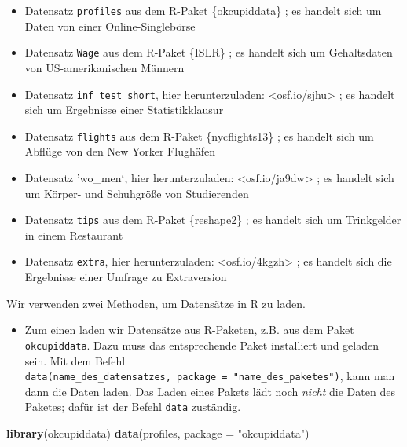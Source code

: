 \documentclass[12pt,ngerman,]{book}
\newenvironment{Shaded}{\begin{snugshade}}{\end{snugshade}}
\newcommand{\KeywordTok}[1]{\textcolor[rgb]{0.13,0.29,0.53}{\textbf{{#1}}}}
\newcommand{\DataTypeTok}[1]{\textcolor[rgb]{0.13,0.29,0.53}{{#1}}}
\newcommand{\StringTok}[1]{\textcolor[rgb]{0.31,0.60,0.02}{{#1}}}
\newcommand{\NormalTok}[1]{{#1}}
\providecommand{\tightlist}{%
  \setlength{\itemsep}{0pt}\setlength{\parskip}{0pt}}
\renewenvironment{Shaded}{\begin{kframe}}{\end{kframe}}
\begin{document}
\begin{itemize}
\tightlist
\item
  Datensatz \texttt{profiles} aus dem R-Paket \{okcupiddata\}
  \citep{kim2015okcupid}; es handelt sich um Daten von einer
  Online-Singlebörse
\item
  Datensatz \texttt{Wage} aus dem R-Paket \{ISLR\}
  \citep{introstatlearning}; es handelt sich um Gehaltsdaten von
  US-amerikanischen Männern
\item
  Datensatz \texttt{inf\_test\_short}, hier herunterzuladen:
  \textless{}osf.io/sjhu\textgreater{} \citep{Sauer_2017}; es handelt
  sich um Ergebnisse einer Statistikklausur
\item
  Datensatz \texttt{flights} aus dem R-Paket \{nycflights13\}
  \citep{nycflights13}; es handelt sich um Abflüge von den New Yorker
  Flughäfen
\item
  Datensatz 'wo\_men`, hier herunterzuladen:
  \textless{}osf.io/ja9dw\textgreater{} \citep{Sauer_2017a}; es handelt
  sich um Körper- und Schuhgröße von Studierenden
\item
  Datensatz \texttt{tips} aus dem R-Paket \{reshape2\}
  \citep{bryant1995practical}; es handelt sich um Trinkgelder in einem
  Restaurant
\item
  Datensatz \texttt{extra}, hier herunterzuladen:
  \textless{}osf.io/4kgzh\textgreater{} \citep{Sauer_2016}; es handelt
  sich die Ergebnisse einer Umfrage zu Extraversion
\end{itemize}

Wir verwenden zwei Methoden, um Datensätze in R zu laden.

\begin{itemize}
\tightlist
\item
  Zum einen laden wir Datensätze aus R-Paketen, z.B. aus dem Paket
  \texttt{okcupiddata}. Dazu muss das entsprechende Paket installiert
  und geladen sein. Mit dem Befehl
  \texttt{data(name\_des\_datensatzes,\ package\ =\ "name\_des\_paketes")},
  kann man dann die Daten laden. Das Laden eines Pakets lädt noch
  \emph{nicht} die Daten des Paketes; dafür ist der Befehl \texttt{data}
  zuständig.
\end{itemize}

\begin{Shaded}
\begin{Highlighting}[]
\KeywordTok{library}\NormalTok{(okcupiddata) }\KeywordTok{data}\NormalTok{(profiles, }\DataTypeTok{package =} \StringTok{"okcupiddata"}\NormalTok{)}
\end{Highlighting}
\end{Shaded}
\end{document}
